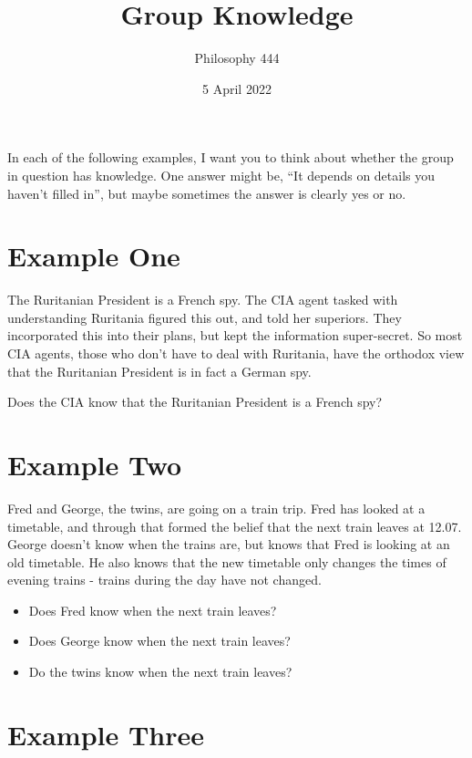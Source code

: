 \documentclass[
  11pt,
]{article}
\title{Group Knowledge}
\author{Philosophy 444}
\date{5 April 2022}
\providecommand{\tightlist}{%
  \setlength{\itemsep}{0pt}\setlength{\parskip}{0pt}}
\begin{document}
\maketitle

In each of the following examples, I want you to think about whether the
group in question has knowledge. One answer might be, ``It depends on
details you haven't filled in'', but maybe sometimes the answer is
clearly yes or no.

\hypertarget{example-one}{%
\section{Example One}\label{example-one}}

The Ruritanian President is a French spy. The CIA agent tasked with
understanding Ruritania figured this out, and told her superiors. They
incorporated this into their plans, but kept the information
super-secret. So most CIA agents, those who don't have to deal with
Ruritania, have the orthodox view that the Ruritanian President is in
fact a German spy.

Does the CIA know that the Ruritanian President is a French spy?

\hypertarget{example-two}{%
\section{Example Two}\label{example-two}}

Fred and George, the twins, are going on a train trip. Fred has looked
at a timetable, and through that formed the belief that the next train
leaves at 12.07. George doesn't know when the trains are, but knows that
Fred is looking at an old timetable. He also knows that the new
timetable only changes the times of evening trains - trains during the
day have not changed.

\begin{itemize}
\tightlist
\item
  Does Fred know when the next train leaves?
\item
  Does George know when the next train leaves?
\item
  Do the twins know when the next train leaves?
\end{itemize}

\hypertarget{example-three}{%
\section{Example Three}\label{example-three}}
\end{document}
